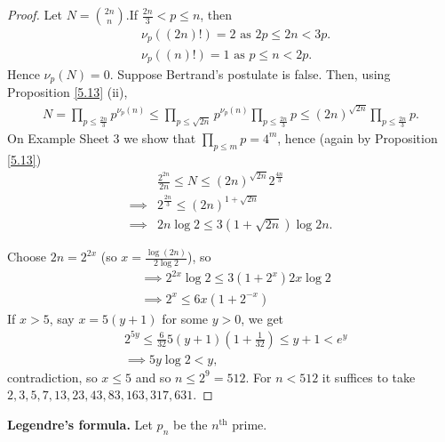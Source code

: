 \documentclass{article}
\theoremstyle{definition}
\begin{document}
\begin{proof}
    Let $N={{2n}\choose{n}}$.If $\frac{2n}{3}<p\le n$, then 
    \begin{align*}
        &\nu_p((2n)!) = 2 \text{ as } 2p\le 2n<3p. \\
        &\nu_p((n)!) = 1 \text{ as } p\le n<2p.
    \end{align*}
    Hence $\nu_p(N)=0$. Suppose Bertrand's postulate is false. Then, using Proposition \ref{5.13} (ii),
    \begin{align*}
        N = \prod_{p\le \frac{2n}{3}}^{} p^{\nu_p(n)} \le \prod_{p \le \sqrt{2n}}^{} p^{\nu_p(n)}\prod_{p\le \frac{2n}{3}}^{} p \le (2n)^{\sqrt{2n}} \prod_{p\le \frac{2n}{3}}^{} p.
    \end{align*}
    On Example Sheet 3 we show that $\prod_{p\le m}^{} p = 4^m$, hence (again by Proposition \ref{5.13})
    \begin{align*}
        &\frac{2^{2n}}{2n} \le N \le (2n)^{\sqrt{2n}} 2^{\frac{4n}{3}} \\
        \implies& 2^{\frac{2n}{3}} \le (2n)^{1+\sqrt{2n}} \\
        \implies& 2n \log 2 \le 3(1+\sqrt{2n})\log2n.
    \end{align*}


    Choose $2n=2^{2x}$ (so $x = \frac{\log(2n)}{2\log 2}$), so
    \begin{align*}
        &\implies 2^{2x}\log 2 \le 3(1+2^x)2x \log 2 \\
        &\implies 2^x \le 6x(1+2^{-x})
    \end{align*}
    If $x>5$, say $x=5(y+1)$ for some $y>0$, we get
    \begin{align*}
        &2^{5y} \le \frac{6}{32}5(y+1)(1+\frac{1}{32})\le y+1< e^y \\
        &\implies 5y \log 2 < y,
    \end{align*}
    contradiction, so $x\le 5$ and so $n\le 2^9 = 512$. For $n<512$ it suffices to take $2,3,5,7,13,23,43,83,163,317,631$.
\end{proof}
\vspace{1mm}

\textbf{Legendre's formula.} Let $p_n$ be the $n^{\text{th}}$ prime.
\end{document}
